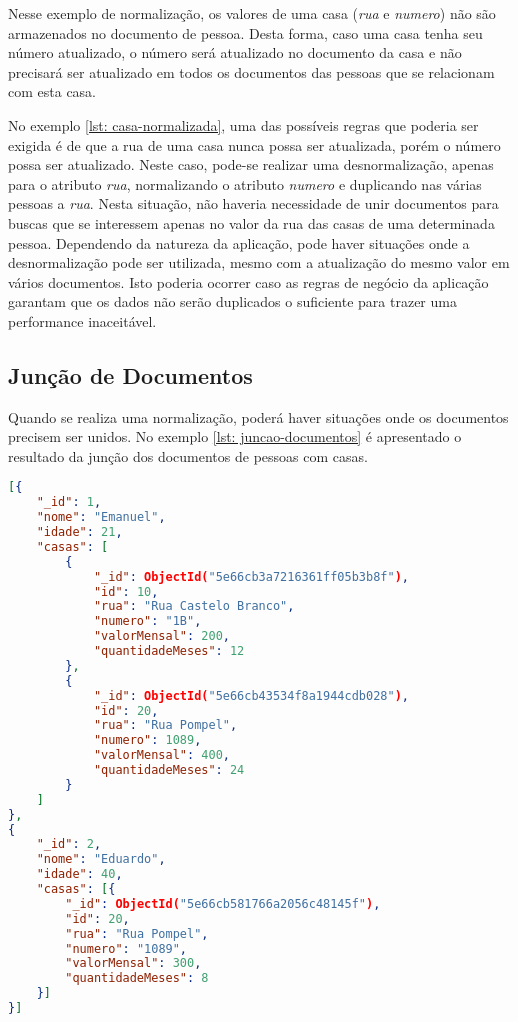 Nesse exemplo de normalização, os valores de uma casa (\textit{rua} e \textit{numero}) não são armazenados no documento de pessoa. Desta forma, caso uma casa tenha seu número atualizado, o número será atualizado no documento da casa e não precisará ser atualizado em todos os documentos das pessoas que se relacionam com esta casa.
    
No exemplo \ref{lst: casa-normalizada}, uma das possíveis regras que poderia ser exigida é de que a rua de uma casa nunca possa ser atualizada, porém o número possa ser atualizado. Neste caso, pode-se realizar uma desnormalização, apenas para o atributo \textit{rua}, normalizando o atributo \textit{numero} e duplicando nas várias pessoas a \textit{rua}. Nesta situação, não haveria necessidade de unir documentos para buscas que se interessem apenas no valor da rua das casas de uma determinada pessoa. Dependendo da natureza da aplicação, pode haver situações onde a desnormalização pode ser utilizada, mesmo com a atualização do mesmo valor em vários documentos. Isto poderia ocorrer caso as regras de negócio da aplicação garantam que os dados não serão duplicados o suficiente para trazer uma performance inaceitável.

\subsection{Junção de Documentos\label{subsection: juncao-documentos}}
    
Quando se realiza uma normalização, poderá haver situações onde os documentos precisem ser unidos. No exemplo \ref{lst: juncao-documentos} é apresentado o resultado da junção dos documentos de pessoas com casas.

\newpage

\begin{lstlisting}[language=json, caption={Junção de Documentos Normalizados\label{lst: juncao-documentos}}]
[{
    "_id": 1,
    "nome": "Emanuel",
    "idade": 21,
    "casas": [
        {
            "_id": ObjectId("5e66cb3a7216361ff05b3b8f"),
            "id": 10,
            "rua": "Rua Castelo Branco",
            "numero": "1B",
            "valorMensal": 200,
            "quantidadeMeses": 12
        },
        {
            "_id": ObjectId("5e66cb43534f8a1944cdb028"),
            "id": 20,
            "rua": "Rua Pompel",
            "numero": 1089,
            "valorMensal": 400,
            "quantidadeMeses": 24
        }
    ]
},
{
    "_id": 2,
    "nome": "Eduardo",
    "idade": 40,
    "casas": [{
        "_id": ObjectId("5e66cb581766a2056c48145f"),
        "id": 20,
        "rua": "Rua Pompel",
        "numero": "1089",
        "valorMensal": 300,
        "quantidadeMeses": 8
    }]
}]
\end{lstlisting}

